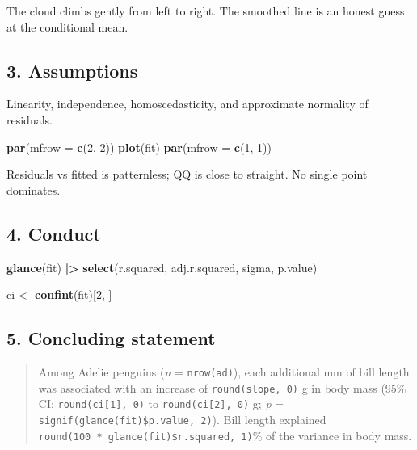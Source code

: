 \documentclass[
]{article}
\newenvironment{Shaded}{\begin{snugshade}}{\end{snugshade}}
\newcommand{\AttributeTok}[1]{\textcolor[rgb]{0.13,0.29,0.53}{#1}}
\newcommand{\DecValTok}[1]{\textcolor[rgb]{0.00,0.00,0.81}{#1}}
\newcommand{\FunctionTok}[1]{\textcolor[rgb]{0.13,0.29,0.53}{\textbf{#1}}}
\newcommand{\NormalTok}[1]{#1}
\newcommand{\OtherTok}[1]{\textcolor[rgb]{0.56,0.35,0.01}{#1}}
\newcommand{\SpecialCharTok}[1]{\textcolor[rgb]{0.81,0.36,0.00}{\textbf{#1}}}
\begin{document}
The cloud climbs gently from left to right. The smoothed line is an
honest guess at the conditional mean.

\subsection{3. Assumptions}\label{assumptions}

Linearity, independence, homoscedasticity, and approximate normality of
residuals.

\begin{Shaded}
\begin{Highlighting}[]
\FunctionTok{par}\NormalTok{(}\AttributeTok{mfrow =} \FunctionTok{c}\NormalTok{(}\DecValTok{2}\NormalTok{, }\DecValTok{2}\NormalTok{))}
\FunctionTok{plot}\NormalTok{(fit)}
\FunctionTok{par}\NormalTok{(}\AttributeTok{mfrow =} \FunctionTok{c}\NormalTok{(}\DecValTok{1}\NormalTok{, }\DecValTok{1}\NormalTok{))}
\end{Highlighting}
\end{Shaded}

Residuals vs fitted is patternless; QQ is close to straight. No single
point dominates.

\subsection{4. Conduct}\label{conduct}

\begin{Shaded}
\begin{Highlighting}[]
\FunctionTok{glance}\NormalTok{(fit) }\SpecialCharTok{|\textgreater{}} \FunctionTok{select}\NormalTok{(r.squared, adj.r.squared, sigma, p.value)}
\end{Highlighting}
\end{Shaded}

\begin{Shaded}
\begin{Highlighting}[]
\NormalTok{ci }\OtherTok{\textless{}{-}} \FunctionTok{confint}\NormalTok{(fit)[}\DecValTok{2}\NormalTok{, ]}
\end{Highlighting}
\end{Shaded}

\subsection{5. Concluding statement}\label{concluding-statement}

\begin{quote}
Among Adelie penguins (\emph{n} = \texttt{nrow(ad)}), each additional mm
of bill length was associated with an increase of
\texttt{round(slope,\ 0)} g in body mass (95\% CI:
\texttt{round(ci{[}1{]},\ 0)} to \texttt{round(ci{[}2{]},\ 0)} g;
\emph{p} = \texttt{signif(glance(fit)\$p.value,\ 2)}). Bill length
explained \texttt{round(100\ *\ glance(fit)\$r.squared,\ 1)}\% of the
variance in body mass.
\end{quote}
\end{document}
